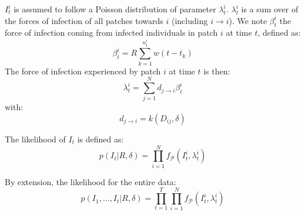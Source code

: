 \documentclass[a4paper,11pt]{article}
\begin{document}
$I_t^i$ is assumed to follow a Poisson distribution of parameter $\lambda_t^i$.
$\lambda_t^i$ is a sum over of the forces of infection of all patches towards $i$ (including $i \rightarrow i$). 
We note $\beta_t^i$ the force of infection coming from infected individuals in patch $i$ at time $t$, defined as:
\begin{equation}
 \beta_t^i = R \sum_{k=1}^{n_t^i} w(t - t_k)
\end{equation}
The force of infection experienced by patch $i$ at time $t$ is then:
\begin{equation}
\lambda_t^i =  \sum_{j=1}^N d_{j\rightarrow i} \beta_t^i
\end{equation}
with:
\begin{equation}
d_{j\rightarrow i} = k(D_{ij}, \delta)
\end{equation}

The likelihood of $I_t$ is defined as:
\begin{equation}
p(I_t | R, \delta) = \prod_{i=1}^N f_\mathcal{P}(I_t^i, \lambda_t^i)
\end{equation}

By extension, the likelihood for the entire data:
\begin{equation}
p(I_1, \ldots, I_t | R, \delta) = \prod_{t=1}^T \prod_{i=1}^N f_\mathcal{P}(I_t^i, \lambda_t^i)
\end{equation}
\end{document}
